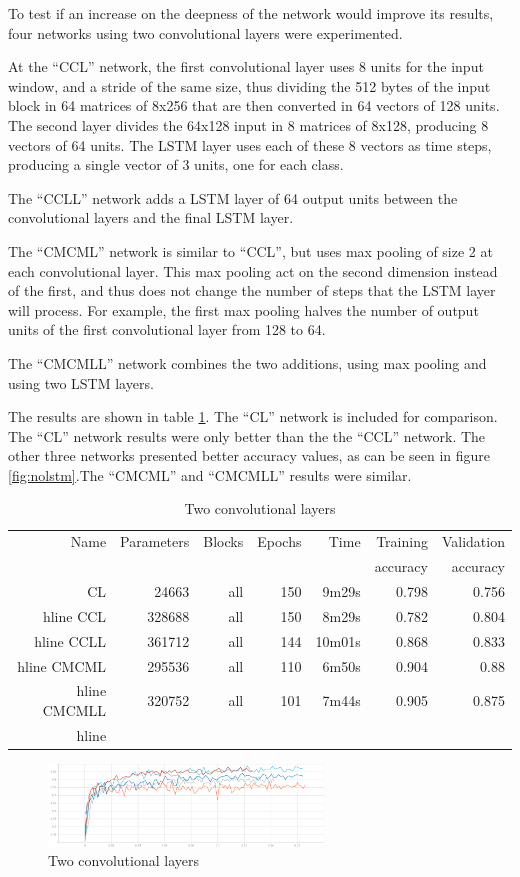 To test if an increase on the deepness of the network would improve its results, four networks using two convolutional layers were experimented. 

At the ``CCL'' network, the first convolutional layer uses 8 units for the input window, and a stride of the same size, thus dividing the 512 bytes of the input block in 64 matrices of 8x256 that are then converted in 64 vectors of 128 units. The second layer divides the 64x128 input in 8 matrices of 8x128, producing 8 vectors of 64 units. The LSTM layer uses each of these 8 vectors as time steps, producing a single vector of 3 units, one for each class.

The ``CCLL'' network adds a LSTM layer of 64 output units between the convolutional layers and the final LSTM layer.

The ``CMCML'' network is similar to ``CCL'', but uses max pooling of size 2 at each convolutional layer. This max pooling act on the second dimension instead of the first, and thus does not change the number of steps that the LSTM layer will process. For example, the first max pooling halves the number of output units of the first convolutional layer from 128 to 64.

The ``CMCMLL'' network combines the two additions, using max pooling and using two LSTM layers.

The results are shown in table \ref{tab:carving2convs}. The ``CL'' network is included for comparison. The  ``CL'' network results were only better than the the ``CCL'' network. The other three networks presented better accuracy values, as can be seen in figure \ref{fig:nolstm}.The ``CMCML'' and ``CMCMLL'' results were similar.

\begin{table}[!ht]
    \centering
    \caption{Two convolutional layers}
    \label{tab:carving2convs}
\begin{tabular}{r|r|r|r|r|r|r}
\hline
Name & Parameters & Blocks & Epochs & Time & Training          & Validation          \\       
     &            &        &        &         &          accuracy &            accuracy \\ \hline\hline

CL	    & 24663	    & all	& 150	& 9m29s	    & 0.798	& 0.756 \\hline
CCL	    & 328688	& all	& 150	& 8m29s	    & 0.782	& 0.804 \\hline
CCLL	& 361712	& all	& 144	& 10m01s	& 0.868	& 0.833 \\hline
CMCML	& 295536	& all	& 110	& 6m50s	    & 0.904	& 0.88 \\hline
CMCMLL	& 320752	& all	& 101	& 7m44s	    & 0.905	& 0.875 \\hline
\end{tabular}
\end{table}

\begin{figure}[htb!]
\centering\includegraphics[width=0.65\textwidth]{content/twoconvs.png}
\caption{\label{fig:twoconvs}Two convolutional layers}%
\end{figure}
